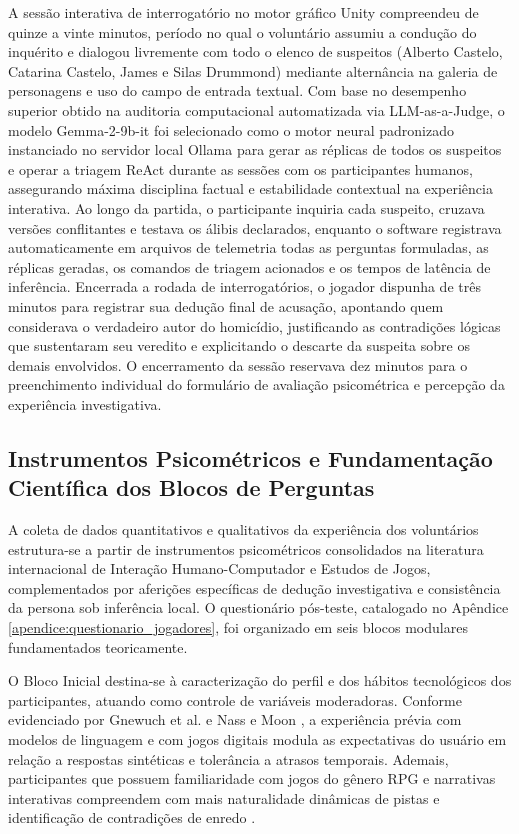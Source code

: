 A sessão interativa de interrogatório no motor gráfico Unity compreendeu de quinze a vinte minutos, período no qual o voluntário assumiu a condução do inquérito e dialogou livremente com todo o elenco de suspeitos (Alberto Castelo, Catarina Castelo, James e Silas Drummond) mediante alternância na galeria de personagens e uso do campo de entrada textual. Com base no desempenho superior obtido na auditoria computacional automatizada via LLM-as-a-Judge, o modelo Gemma-2-9b-it foi selecionado como o motor neural padronizado instanciado no servidor local Ollama para gerar as réplicas de todos os suspeitos e operar a triagem ReAct durante as sessões com os participantes humanos, assegurando máxima disciplina factual e estabilidade contextual na experiência interativa. Ao longo da partida, o participante inquiria cada suspeito, cruzava versões conflitantes e testava os álibis declarados, enquanto o software registrava automaticamente em arquivos de telemetria todas as perguntas formuladas, as réplicas geradas, os comandos de triagem acionados e os tempos de latência de inferência. Encerrada a rodada de interrogatórios, o jogador dispunha de três minutos para registrar sua dedução final de acusação, apontando quem considerava o verdadeiro autor do homicídio, justificando as contradições lógicas que sustentaram seu veredito e explicitando o descarte da suspeita sobre os demais envolvidos. O encerramento da sessão reservava dez minutos para o preenchimento individual do formulário de avaliação psicométrica e percepção da experiência investigativa.

\subsection{Instrumentos Psicométricos e Fundamentação Científica dos Blocos de Perguntas}
A coleta de dados quantitativos e qualitativos da experiência dos voluntários estrutura-se a partir de instrumentos psicométricos consolidados na literatura internacional de Interação Humano-Computador e Estudos de Jogos, complementados por aferições específicas de dedução investigativa e consistência da persona sob inferência local. O questionário pós-teste, catalogado no Apêndice \ref{apendice:questionario_jogadores}, foi organizado em seis blocos modulares fundamentados teoricamente.

O Bloco Inicial destina-se à caracterização do perfil e dos hábitos tecnológicos dos participantes, atuando como controle de variáveis moderadoras. Conforme evidenciado por Gnewuch et al. \cite{gnewuch2018faster} e Nass e Moon \cite{nass2000machines}, a experiência prévia com modelos de linguagem e com jogos digitais modula as expectativas do usuário em relação a respostas sintéticas e tolerância a atrasos temporais. Ademais, participantes que possuem familiaridade com jogos do gênero RPG e narrativas interativas compreendem com mais naturalidade dinâmicas de pistas e identificação de contradições de enredo \cite{fernandez2014introduction}.


